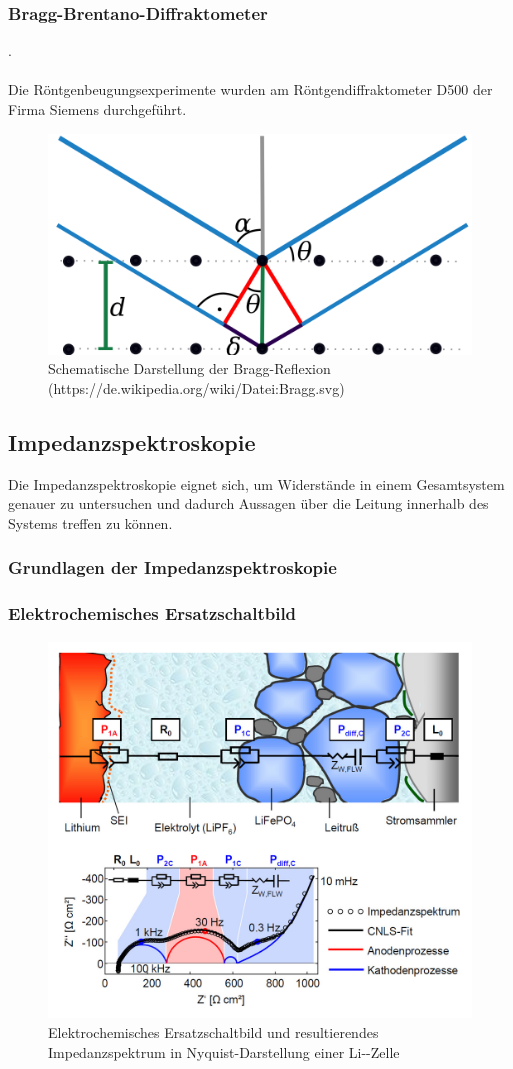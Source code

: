 \documentclass[a4paper, 11pt, headsepline,footsepline,twoside,abstract]{scrbook}
\begin{document}
\subsubsection{Bragg-Brentano-Diffraktometer}
.
\\\\
Die Röntgenbeugungsexperimente wurden am Röntgendiffraktometer D500 der Firma Siemens durchgeführt. %
\begin{figure}
	\centering
	\includegraphics[width=0.6\columnwidth]{images/Bragg.png}
	\caption{Schematische Darstellung der Bragg-Reflexion (https://de.wikipedia.org/wiki/Datei:Bragg.svg)}
	\label{bragg}
\end{figure}
\subsection{Impedanzspektroskopie}
Die Impedanzspektroskopie eignet sich, um Widerstände in einem Gesamtsystem genauer zu untersuchen und dadurch Aussagen über die Leitung innerhalb des Systems treffen zu können.
\subsubsection{Grundlagen der Impedanzspektroskopie}
\subsubsection{Elektrochemisches Ersatzschaltbild}
\begin{figure}
	\centering
	\includegraphics[width=0.8\columnwidth]{images/Schema_IS.jpg}
	\caption{Elektrochemisches Ersatzschaltbild und resultierendes Impedanzspektrum in Nyquist-Darstellung einer Li--Zelle}
	\label{schema_is}
\end{figure}
\end{document}
